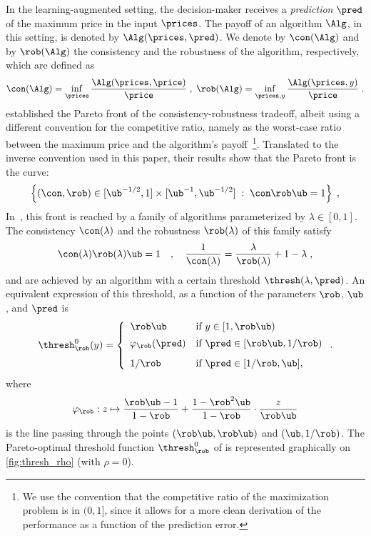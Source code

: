 In the learning-augmented setting, the decision-maker receives a {\em prediction} $\pred$ of the maximum price in the input $\prices$. The payoff of an algorithm $\Alg$, in this setting, is denoted by $\Alg(\prices, \pred)$. We denote by $\con(\Alg)$ and by $\rob(\Alg)$ the consistency and the robustness of the algorithm, respectively, which are defined as
\[
\con(\Alg) = \inf_{\prices} \frac{\Alg(\prices, \price)}{\price} \;,
\;
\rob(\Alg) = \inf_{\prices,y} \frac{\Alg(\prices, y)}{\price} \;.
\]
\citet{sun_online_2024} established the Pareto front of the consistency-robustness tradeoff, albeit using a different convention for the competitive ratio, namely as the worst-case ratio between the maximum price and the algorithm's payoff~\footnote{We use the convention that the competitive ratio of the maximization problem is in $(0,1]$, since it allows for a more clean derivation of the performance as a function of the prediction error.}. Translated to the inverse convention used in this paper, their results show that the Pareto front is  the curve:
\begin{align}\label{eq:pareto_optimal_front}
    \left\{
    (\con, \rob) \in [\ub^{-1/2},1]\times [\ub^{-1},\ub^{-1/2}] \; : \;
    \con \rob \ub=1 \right\}\;,
\end{align}
In~\citet{sun_online_2024}, this front is reached by a family of algorithms parameterized by $\lambda \in [0,1]$. The consistency $\con(\lambda)$ and the robustness $\rob(\lambda)$ of this family satisfy
\[
\con(\lambda) \rob(\lambda) \ub = 1 
\quad, \quad
\frac{1}{\con(\lambda)} = \frac{\lambda}{\rob(\lambda)} + 1 - \lambda\;,
\]
and are achieved by an algorithm with a certain threshold $\thresh(\lambda, \pred)$. An equivalent expression of this threshold, as a function of the parameters $\rob$, $\ub$, and $\pred$ is
\[
\thresh^0_\rob(y) = \left\{
 \begin{array}{lll}
    \rob \ub & \text{if } y \in [1,\rob \ub) \\[5pt]
     \varphi_\rob(\pred) &\text{if } \pred \in [\rob \ub, 1/\rob)\\[8pt]
     1/\rob & \text{if } \pred \in [1/\rob, \ub],
\end{array}
\right. .
\]
where 
\[
\varphi_\rob : z \mapsto \frac{\rob \ub - 1}{1 - \rob} + \frac{1 - \rob^2 \ub}{1 - \rob} \cdot \frac{z}{\rob \ub}
\]
is the line passing through the points $(\rob\ub, \rob \ub)$ and $(\ub, 1/\rob)$.
%
The Pareto-optimal threshold function $\thresh^0_\rob$ of \cite{sun_online_2024}
is represented graphically on \cref{fig:thresh_rho} (with $\rho=0$).

